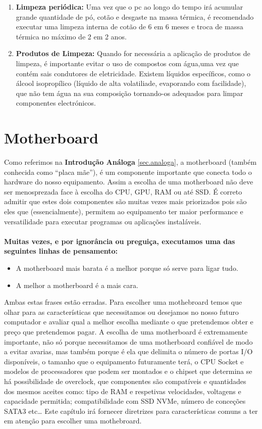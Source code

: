 \begin{enumerate}
	\item \textbf{Limpeza periódica:} Uma vez que o pc ao longo do tempo irá acumular grande quantidade de pó, cotão e desgaste na massa térmica, é recomendado executar uma limpeza interna de cotão de 6 em 6 meses e troca de massa térmica no máximo de 2 em 2 anos.
	\item \textbf{Produtos de Limpeza:} Quando for necessária a aplicação de produtos de limpeza, é importante evitar o uso de compostos com água,uma vez que contém sais condutores de eletricidade. Existem líquidos específicos, como o álcool isopropílico (líquido de alta volatiliade, evaporando com facilidade), que não tem água na sua composição tornando-os adequados para limpar componentes electrónicos.
\end{enumerate}

\chapter{Motherboard}
\label{chap.motherboard}
Como referimos na \textbf{Introdução Análoga} \ref{sec.analoga}, a motherboard (também conhecida como “placa mãe”), é um componente importante que conecta todo o hardware do nosso equipamento. Assim a escolha de uma motherboard não deve ser menosprezada face à escolha do CPU, GPU, RAM ou até SSD. É correto admitir que estes dois componentes são muitas vezes mais priorizados pois são eles que (essencialmente), permitem ao equipamento ter maior performance e versatilidade para executar programas ou aplicações instaláveis. \\
\\ \textbf{Muitas vezes, e por ignorância ou preguiça, executamos uma das seguintes linhas de pensamento:}
\begin{itemize}
\item A motherboard mais barata é a melhor porque só serve para ligar tudo.
\item A melhor a motherboard é a mais cara.
\end{itemize}
Ambas estas frases estão erradas. Para escolher uma mothebroard temos que olhar para as características que necessitamos ou desejamos no nosso futuro computador e avaliar qual a melhor escolha mediante o que pretendemos obter e preço que pretendemos pagar.
 A escolha de uma motherboard é extremamente importante, não só porque necessitamos de uma motherboard confiável de modo a evitar avarias, mas também porque é ela que delimita o número de portas I/O disponíveis, o tamanho que o equipamento futuramente terá, o CPU Socket e modelos de processadores que podem ser montados e o chipset que determina se há possibilidade de overclock, que componentes são compatíveis e quantidades dos mesmos aceites como: tipo de RAM e respetivas velocidades, voltagens e capacidade permitida; compatibilidade com SSD NVMe, número de conceções SATA3 etc…
Este capítulo irá fornecer diretrizes para características comuns a ter em atenção para escolher uma mothebroard. \\ 

